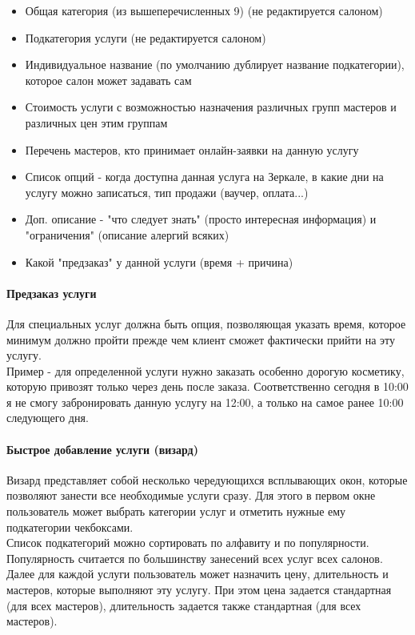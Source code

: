 \documentclass[DIV=calc, paper=a4, fontsize=11pt]{scrartcl} %
\begin{document}
\begin{itemize}
	\item Общая категория (из вышеперечисленных 9) (не редактируется салоном)
	\item Подкатегория услуги (не редактируется салоном)
	\item Индивидуальное название (по умолчанию дублирует название подкатегории), которое салон может задавать сам
	\item Стоимость услуги с возможностью назначения различных групп мастеров и различных цен этим группам
	\item Перечень мастеров, кто принимает онлайн-заявки на данную услугу
	\item Список опций - когда доступна данная услуга на Зеркале, в какие дни на услугу можно записаться, тип продажи (ваучер, оплата...)
	\item Доп. описание - "что следует знать" (просто интересная информация) и "ограничения" (описание алергий всяких)
	\item Какой "предзаказ" у данной услуги (время + причина)
\end{itemize}

\paragraph{Предзаказ услуги}

Для специальных услуг должна быть опция, позволяющая указать время, которое минимум должно пройти прежде чем клиент сможет фактически прийти на эту услугу. 
\\[0.5cm]
Пример - для определенной услуги нужно заказать особенно дорогую косметику, которую привозят только через день после заказа. Соответственно сегодня в 10:00 я не смогу забронировать данную услугу на 12:00, а только на самое ранее 10:00 следующего дня.

\paragraph{Быстрое добавление услуги (визард)} \label{paragraph:appointment_wizard}
Визард представляет собой несколько чередующихся всплывающих окон, которые позволяют занести все необходимые услуги сразу. Для этого в первом окне пользователь может выбрать категории услуг и отметить нужные ему подкатегории чекбоксами.
\\[0.5cm]
Список подкатегорий можно сортировать по алфавиту и по популярности. Популярность считается по большинству занесений всех услуг всех салонов.
\\[0.5cm]
Далее для каждой услуги пользователь может назначить цену, длительность и мастеров, которые выполняют эту услугу. При этом цена задается стандартная (для всех мастеров), длительность задается также стандартная (для всех мастеров).
\end{document}
